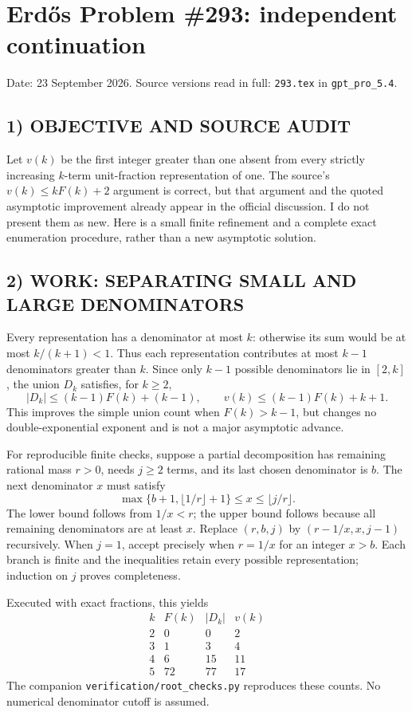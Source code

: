 \section{Erd\H{o}s Problem \#293: independent continuation}
\noindent Date: 23 September 2026. Source versions read in full: \texttt{293.tex} in \texttt{gpt\_pro\_5.4}.

\subsection*{1) OBJECTIVE AND SOURCE AUDIT}
Let $v(k)$ be the first integer greater than one absent from every strictly
increasing $k$-term unit-fraction representation of one. The source's
$v(k)\le kF(k)+2$ argument is correct, but that argument and the quoted
asymptotic improvement already appear in the official discussion. I do
not present them as new. Here is a small finite refinement and a complete
exact enumeration procedure, rather than a new asymptotic solution.

\subsection*{2) WORK: SEPARATING SMALL AND LARGE DENOMINATORS}
Every representation has a denominator at most $k$: otherwise its sum
would be at most $k/(k+1)<1$. Thus each representation contributes at
most $k-1$ denominators greater than $k$. Since only $k-1$ possible
denominators lie in $[2,k]$, the union $D_k$ satisfies, for $k\ge2$,
\[
 |D_k|\le(k-1)F(k)+(k-1),\qquad
 v(k)\le(k-1)F(k)+k+1. \tag{1}
\]
This improves the simple union count when $F(k)>k-1$, but changes no
double-exponential exponent and is not a major asymptotic advance.

For reproducible finite checks, suppose a partial decomposition has
remaining rational mass $r>0$, needs $j\ge2$ terms, and its last chosen
denominator is $b$. The next denominator $x$ must satisfy
\[
 \max\{b+1,\lfloor1/r\rfloor+1\}\le x\le\lfloor j/r\rfloor.
\]
The lower bound follows from $1/x<r$; the upper bound follows because
all remaining denominators are at least $x$. Replace $(r,b,j)$ by
$(r-1/x,x,j-1)$ recursively. When $j=1$, accept precisely when $r=1/x$
for an integer $x>b$. Each branch is finite and the inequalities retain
every possible representation; induction on $j$ proves completeness.

Executed with exact fractions, this yields
\[
\begin{array}{c|rrr}
k&F(k)&|D_k|&v(k)\\\hline
2&0&0&2\\3&1&3&4\\4&6&15&11\\5&72&77&17
\end{array}
\]
The companion \texttt{verification/root\_checks.py} reproduces these counts.
No numerical denominator cutoff is assumed.

